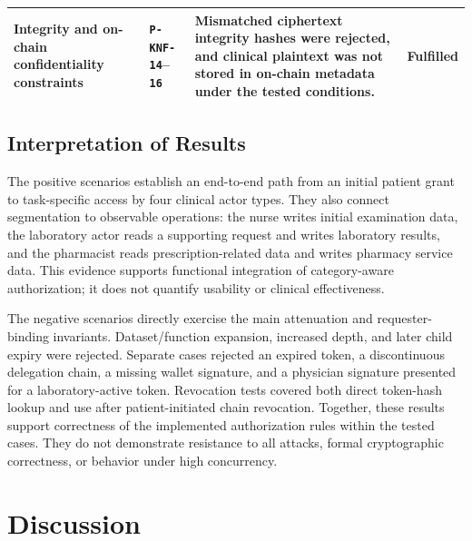 \documentclass[conference,a4paper,english]{IEEEtran}
\begin{document}
\begin{table}[t]
\begin{tabular}{@{}p{}p{}p{}p{}@{}}
		Integrity and on-chain confidentiality constraints                                                                                             &
		\texttt{P-KNF-14}--\texttt{16}                                                                                                                 &
		Mismatched ciphertext integrity hashes were rejected, and clinical plaintext was not stored in on-chain metadata under the tested conditions.  &
		Fulfilled                                                                                                                                                                                                                              \\
		\bottomrule
	\end{tabular}
\end{table}

\subsection{Interpretation of Results}

The positive scenarios establish an end-to-end path from an initial patient grant to task-specific access by four clinical actor types. They also connect segmentation to observable operations: the nurse writes initial examination data, the laboratory actor reads a supporting request and writes laboratory results, and the pharmacist reads prescription-related data and writes pharmacy service data. This evidence supports functional integration of category-aware authorization; it does not quantify usability or clinical effectiveness.

The negative scenarios directly exercise the main attenuation and requester-binding invariants. Dataset/function expansion, increased depth, and later child expiry were rejected. Separate cases rejected an expired token, a discontinuous delegation chain, a missing wallet signature, and a physician signature presented for a laboratory-active token. Revocation tests covered both direct token-hash lookup and use after patient-initiated chain revocation. Together, these results support correctness of the implemented authorization rules within the tested cases. They do not demonstrate resistance to all attacks, formal cryptographic correctness, or behavior under high concurrency.

\section{Discussion}
\label{sec:discussion}
\end{document}
